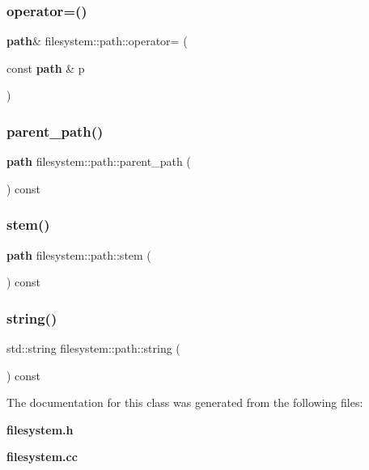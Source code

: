 \subsubsection{operator=()\hspace{0.1cm}{\footnotesize\ttfamily [2/2]}}
{\footnotesize\ttfamily \textbf{ path}\& filesystem\+::path\+::operator= (\begin{DoxyParamCaption}\item[{const \textbf{ path} \&}]{p }\end{DoxyParamCaption})\hspace{0.3cm}{\ttfamily [inline]}}

\mbox{\label{classfilesystem_1_1path_a9564a7fc0e33bcc606510c5de5a38627}} 
\subsubsection{parent\_path()}
{\footnotesize\ttfamily \textbf{ path} filesystem\+::path\+::parent\+\_\+path (\begin{DoxyParamCaption}{ }\end{DoxyParamCaption}) const\hspace{0.3cm}{\ttfamily [inline]}}

\mbox{\label{classfilesystem_1_1path_a0acd461c2e26239ed76fd9f269dae8ca}} 
\subsubsection{stem()}
{\footnotesize\ttfamily \textbf{ path} filesystem\+::path\+::stem (\begin{DoxyParamCaption}{ }\end{DoxyParamCaption}) const\hspace{0.3cm}{\ttfamily [inline]}}

\mbox{\label{classfilesystem_1_1path_a9d7a63336effb5466f7e24a7b0227865}} 
\subsubsection{string()}
{\footnotesize\ttfamily std\+::string filesystem\+::path\+::string (\begin{DoxyParamCaption}{ }\end{DoxyParamCaption}) const\hspace{0.3cm}{\ttfamily [inline]}}



The documentation for this class was generated from the following files\+:\begin{DoxyCompactItemize}
\item 
\textbf{ filesystem.\+h}\item 
\textbf{ filesystem.\+cc}\end{DoxyCompactItemize}
